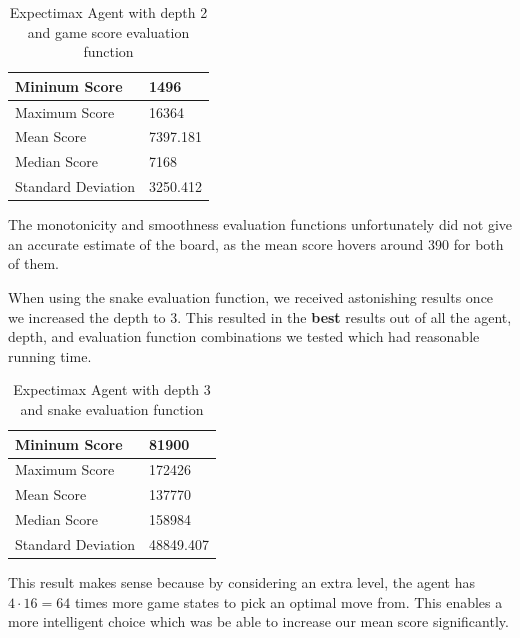 \documentclass[9pt,twocolumn]{article}
\begin{document}
\begin{table}[!htbp]

\centering

\begin{tabular}{|l|l|}
\hline
Mininum Score      & 1496 \\ \hline
Maximum Score      & 16364 \\ \hline
Mean Score         & 7397.181 \\ \hline
Median Score       & 7168 \\ \hline
Standard Deviation & 3250.412 \\ \hline
\end{tabular}

\caption{Expectimax Agent with depth 2 and game score evaluation function}

\end{table}

The monotonicity and smoothness evaluation functions unfortunately did not give an accurate estimate of the board, as the mean score hovers around 390 for both of them.

When using the snake evaluation function, we received astonishing results once we increased the depth to 3. This resulted in the \textbf{best} results out of all the agent, depth, and evaluation function combinations we tested which had reasonable running time.

\begin{table}[!htbp]

\centering

\begin{tabular}{|l|l|}
\hline
Mininum Score      & 81900 \\ \hline
Maximum Score      & 172426 \\ \hline
Mean Score         & 137770 \\ \hline
Median Score       & 158984 \\ \hline
Standard Deviation & 48849.407 \\ \hline
\end{tabular}

\caption{Expectimax Agent with depth 3 and snake evaluation function}

\end{table}

This result makes sense because by considering an extra level, the agent has $4 \cdot 16 = 64$ times more game states to pick an optimal move from. This enables a more intelligent choice which was be able to increase our mean score significantly.
\end{document}

